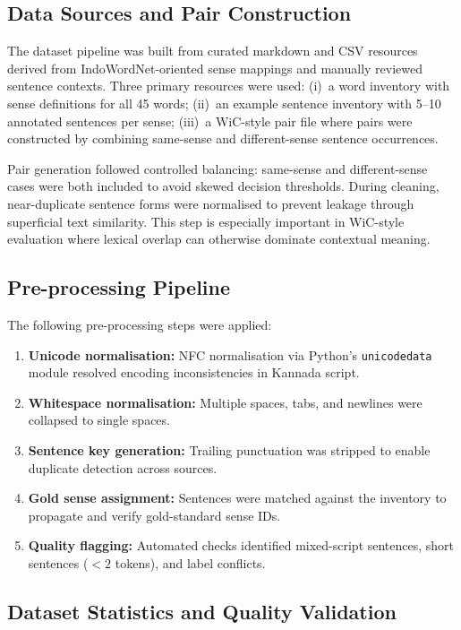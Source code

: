 \documentclass{ieeeaccess}
\begin{document}
\subsection{Data Sources and Pair Construction}

The dataset pipeline was built from curated markdown and CSV resources derived
from IndoWordNet-oriented sense mappings and manually reviewed sentence
contexts.
Three primary resources were used:
(i)~a word inventory with sense definitions for all 45 words;
(ii)~an example sentence inventory with 5--10 annotated sentences per sense;
(iii)~a WiC-style pair file where pairs were constructed by combining same-sense
and different-sense sentence occurrences.

Pair generation followed controlled balancing: same-sense and different-sense
cases were both included to avoid skewed decision thresholds.
During cleaning, near-duplicate sentence forms were normalised to prevent
leakage through superficial text similarity.
This step is especially important in WiC-style evaluation where lexical overlap
can otherwise dominate contextual meaning.

\subsection{Pre-processing Pipeline}

The following pre-processing steps were applied:
\begin{enumerate}
  \item \textbf{Unicode normalisation:} NFC normalisation via Python's
        \texttt{unicodedata} module resolved encoding inconsistencies in
        Kannada script.
  \item \textbf{Whitespace normalisation:} Multiple spaces, tabs, and newlines
        were collapsed to single spaces.
  \item \textbf{Sentence key generation:} Trailing punctuation was stripped
        to enable duplicate detection across sources.
  \item \textbf{Gold sense assignment:} Sentences were matched against the
        inventory to propagate and verify gold-standard sense IDs.
  \item \textbf{Quality flagging:} Automated checks identified mixed-script
        sentences, short sentences ($<2$ tokens), and label conflicts.
\end{enumerate}

\subsection{Dataset Statistics and Quality Validation}
\end{document}
